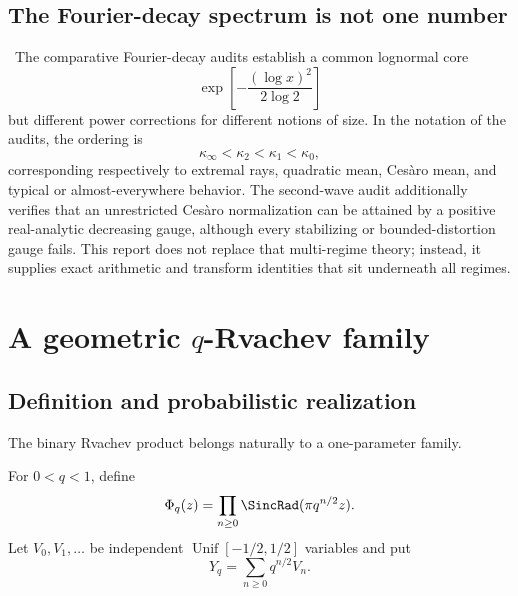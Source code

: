 \documentclass[11pt]{article}
\numberwithin{equation}{section}
\theoremstyle{definition}
\theoremstyle{remark}
\begin{document}
\subsection{The Fourier-decay spectrum is not one number}
\statusE\ The comparative Fourier-decay audits establish a common lognormal core
\[
 \exp\!\left[-\frac{(\log x)^2}{2\log2}\right]
\]
but different power corrections for different notions of size.  In the notation of the
audits, the ordering is
\[
 \kappa_\infty<\kappa_2<\kappa_1<\kappa_0,
\]
corresponding respectively to extremal rays, quadratic mean, Ces\`aro mean, and typical or
almost-everywhere behavior.  The second-wave audit additionally verifies that an
unrestricted Ces\`aro normalization can be attained by a positive real-analytic decreasing
gauge, although every stabilizing or bounded-distortion gauge fails.  This report does not
replace that multi-regime theory; instead, it supplies exact arithmetic and transform
identities that sit underneath all regimes.

\section{A geometric $q$-Rvachev family}
\label{p9:sec:qfamily}

\subsection{Definition and probabilistic realization}
The binary Rvachev product belongs naturally to a one-parameter family.

\begin{definition}
For $0<q<1$, define
\begin{equation}
 \Phi_q(z)=\prod_{n\ge0}\SincRad(\pi q^{n/2}z).               \label{p9:eq:Phiq}
\end{equation}
Let $V_0,V_1,\ldots$ be independent $\operatorname{Unif}[-1/2,1/2]$ variables and put
\begin{equation}
 Y_q=\sum_{n\ge0}q^{n/2}V_n.                               \label{p9:eq:Yq}
\end{equation}
\end{definition}
\end{document}
